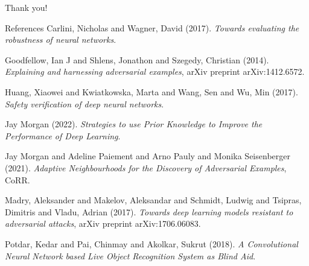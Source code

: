 \documentclass[smaller]{beamer}
\begin{document}
\begin{frame}[label={sec:org9cb45cb},plain,c]{}
\begin{center}
\vspace{1em}\Huge Thank you!
\end{center}
\end{frame}
\begin{frame}[label={sec:orgd64b862}]{References}
\noindent
Carlini, Nicholas and Wagner, David (2017). \emph{Towards evaluating the robustness of neural networks}.

\noindent
Goodfellow, Ian J and Shlens, Jonathon and Szegedy, Christian (2014). \emph{Explaining and harnessing adversarial examples}, arXiv preprint arXiv:1412.6572.

\noindent
Huang, Xiaowei and Kwiatkowska, Marta and Wang, Sen and Wu, Min (2017). \emph{Safety verification of deep neural networks}.

\noindent
Jay Morgan (2022). \emph{Strategies to use Prior Knowledge to Improve the Performance of Deep Learning}.

\noindent
Jay Morgan and Adeline Paiement and Arno Pauly and Monika Seisenberger (2021). \emph{Adaptive Neighbourhoods for the Discovery of Adversarial Examples}, CoRR.

\noindent
Madry, Aleksander and Makelov, Aleksandar and Schmidt, Ludwig and Tsipras, Dimitris and Vladu, Adrian (2017). \emph{Towards deep learning models resistant to adversarial attacks}, arXiv preprint arXiv:1706.06083.

\noindent
Potdar, Kedar and Pai, Chinmay and Akolkar, Sukrut (2018). \emph{A Convolutional Neural Network based Live Object Recognition System as Blind Aid}.
\end{frame}
\end{document}
